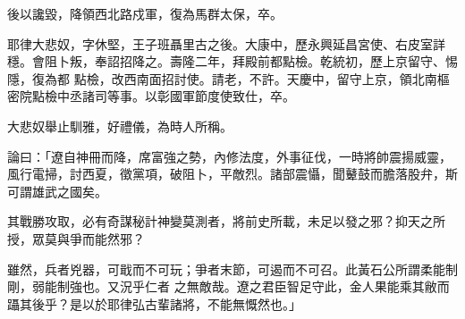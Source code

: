 \begin{pinyinscope}
 後以讒毀，降領西北路戍軍，復為馬群太保，卒。



 耶律大悲奴，字休堅，王子班聶里古之後。大康中，歷永興延昌宮使、右皮室詳穩。會阻卜叛，奉詔招降之。壽隆二年，拜殿前都點檢。乾統初，歷上京留守、惕隱，復為都
 點檢，改西南面招討使。請老，不許。天慶中，留守上京，領北南樞密院點檢中丞諸司等事。以彰國軍節度使致仕，卒。



 大悲奴舉止馴雅，好禮儀，為時人所稱。



 論曰：「遼自神冊而降，席富強之勢，內修法度，外事征伐，一時將帥震揚威靈，風行電掃，討西夏，徵黨項，破阻卜，平敵烈。諸部震懾，聞鼙鼓而膽落股弁，斯可謂雄武之國矣。



 其戰勝攻取，必有奇謀秘計神變莫測者，將前史所載，未足以發之邪？抑天之所授，眾莫與爭而能然邪？



 雖然，兵者兇器，可戢而不可玩；爭者末節，可遏而不可召。此黃石公所謂柔能制剛，弱能制強也。又況乎仁者
 之無敵哉。遼之君臣智足守此，金人果能乘其敝而躡其後乎？是以於耶律弘古輩諸將，不能無慨然也。」



\end{pinyinscope}
